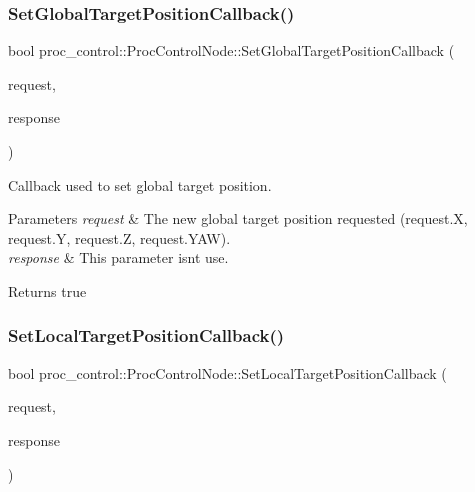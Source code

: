 \subsubsection{\texorpdfstring{Set\+Global\+Target\+Position\+Callback()}{SetGlobalTargetPositionCallback()}}
{\footnotesize\ttfamily bool proc\+\_\+control\+::\+Proc\+Control\+Node\+::\+Set\+Global\+Target\+Position\+Callback (\begin{DoxyParamCaption}\item[{proc\+\_\+control\+::\+Set\+Position\+Target\+Request \&}]{request,  }\item[{proc\+\_\+control\+::\+Set\+Position\+Target\+Response \&}]{response }\end{DoxyParamCaption})}

Callback used to set global target position. 
\begin{DoxyParams}{Parameters}
{\em request} & The new global target position requested (request.\+X, request.\+Y, request.\+Z, request.\+Y\+AW). \\
\hline
{\em response} & This parameter isn\textquotesingle{}t use. \\
\hline
\end{DoxyParams}
\begin{DoxyReturn}{Returns}
true 
\end{DoxyReturn}
\mbox{\label{classproc__control_1_1_proc_control_node_ad331887883a3c1c44472d72dfced3db6}} 
\subsubsection{\texorpdfstring{Set\+Local\+Target\+Position\+Callback()}{SetLocalTargetPositionCallback()}}
{\footnotesize\ttfamily bool proc\+\_\+control\+::\+Proc\+Control\+Node\+::\+Set\+Local\+Target\+Position\+Callback (\begin{DoxyParamCaption}\item[{proc\+\_\+control\+::\+Set\+Position\+Target\+Request \&}]{request,  }\item[{proc\+\_\+control\+::\+Set\+Position\+Target\+Response \&}]{response }\end{DoxyParamCaption})}

